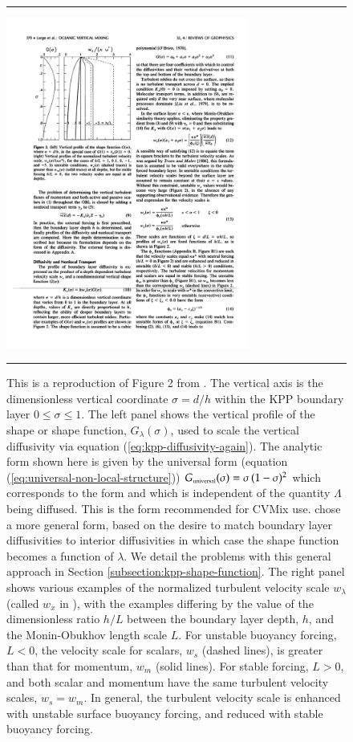  
\begin{figure}[h!t]
\rule{\textwidth}{0.005in}
\begin{center}
\includegraphics[angle=0,width=8cm]{./figs/LargeKPP_fig2.pdf}
\caption[Figure 2 from \cite{LargeKPP}]{ \sf This is a reproduction of
  Figure 2 from \cite{LargeKPP}.  The vertical axis is the
  dimensionless vertical coordinate $\sigma = d/h$ within the KPP
  boundary layer $0 \le \sigma \le 1$.  The left panel shows the
  vertical profile of the shape or shape function,
  $G_{\lambda}(\sigma)$, used to scale the vertical diffusivity via
  equation (\ref{eq:kpp-diffusivity-again}).  The analytic form shown
  here is given by the universal form (equation
  (\ref{eq:universal-non-local-structure})) $G_{\mbox{\tiny
      universal}}(\sigma) = \sigma \, (1-\sigma)^{2}$ which
  corresponds to the \cite{Troen_Mahrt1986} form and which is
  independent of the quantity $\Lambda$ being diffused.  This is the
  form recommended for CVMix use.  \cite{LargeKPP} chose a more
  general form, based on the desire to match boundary layer
  diffusivities to interior diffusivities in which case the shape
  function becomes a function of $\lambda$.  We detail the problems
  with this general approach in Section
  \ref{subsection:kpp-shape-function}.  The right panel shows various
  examples of the normalized turbulent velocity scale $w_{\lambda}$
  (called $w_{x}$ in \cite{LargeKPP}), with the examples differing by
  the value of the dimensionless ratio $h/L$ between the boundary
  layer depth, $h$, and the Monin-Obukhov length scale $L$.  For
  unstable buoyancy forcing, $L<0$, the velocity scale for scalars,
  $w_{s}$ (dashed lines), is greater than that for momentum, $w_{m}$
  (solid lines).  For stable forcing, $L>0$, and both scalar and
  momentum have the same turbulent velocity scales, $w_{s} = w_{m}$.
  In general, the turbulent velocity scale is enhanced with unstable
  surface buoyancy forcing, and reduced with stable buoyancy forcing.}
\label{fig:kpp-figure2-reproduced}
\end{center}
\rule{\textwidth}{0.005in}
\end{figure}



